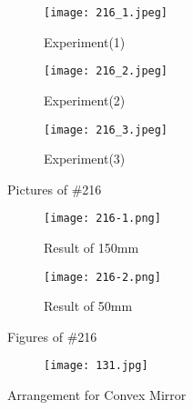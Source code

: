 \begin{figure}[h]
 \centering
 \begin{subfigure}{.45\textwidth}
  \centering
  \texttt{[image: 216\_1.jpeg]}
  \caption{Experiment(1)}
 \end{subfigure}
 \hfill
 \begin{subfigure}{.45\textwidth}
  \centering
  \texttt{[image: 216\_2.jpeg]}
  \caption{Experiment(2)}
 \end{subfigure}
 \vfill
 \begin{subfigure}{.45\textwidth}
  \centering
  \texttt{[image: 216\_3.jpeg]}
  \caption{Experiment(3)}
 \end{subfigure}
 \caption{Pictures of \#216}
\end{figure}


\begin{figure}[h]
 \centering
 \begin{subfigure}{.47\textwidth}
  \centering
  \texttt{[image: 216-1.png]}
  \caption{Result of 150mm}
 \end{subfigure}
 \hfill
 \begin{subfigure}{.47\textwidth}
  \centering
  \texttt{[image: 216-2.png]}
  \caption{Result of 50mm}
 \end{subfigure}
 \caption{Figures of \#216}
\end{figure}
\begin{figure}[h!]
\centering
 \begin{subfigure}{.8\textwidth}
  \centering
  \texttt{[image: 131.jpg]}
 \end{subfigure}
 \caption{Arrangement for Convex Mirror}
\end{figure}